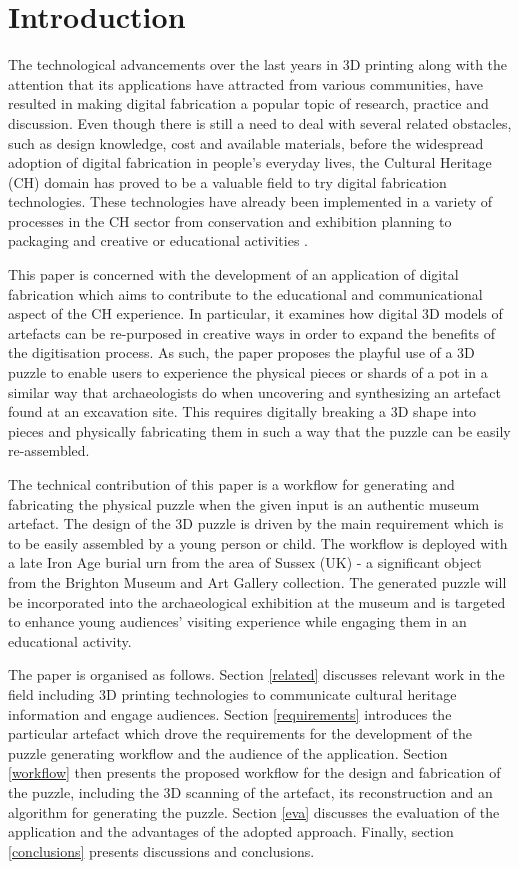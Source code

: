 \documentclass[acmlarge,screen]{acmart}
\begin{document}
\section{Introduction}
The technological advancements over the last years in 3D printing along with the attention that its applications have attracted from various communities, have resulted in making digital fabrication a popular topic of research, practice and discussion. Even though there is still a need to deal with several related obstacles, such as design knowledge, cost and  available materials, before the widespread adoption of digital fabrication in people's everyday lives, the Cultural Heritage (CH) domain has proved to be a valuable field to try digital fabrication technologies. These technologies have already been implemented in a variety of processes in the CH sector from conservation and exhibition planning to packaging and creative or educational activities \cite{Neely2013,Scopigno2014,Neumuller2014,Scopigno2015}.

This paper is concerned with the development of an application of digital fabrication which aims to contribute to the educational and communicational aspect of the CH experience. In particular, it examines how digital 3D models of artefacts can be re-purposed in creative ways in order to expand the benefits of the digitisation process. As such, the paper proposes the playful use of a 3D puzzle to enable users to experience the physical pieces or shards of a pot in a similar way that archaeologists do when uncovering and synthesizing an artefact found at an excavation site. This requires digitally breaking a 3D shape into pieces and physically fabricating them in such a way that the puzzle can be easily re-assembled.

The technical contribution of this paper is a workflow for generating and fabricating the physical puzzle when the given input is an authentic museum artefact. The design of the 3D puzzle is driven by the main requirement which is to be easily assembled by a young person or child. The workflow is deployed with a late Iron Age burial urn from the area of Sussex (UK) - a significant object from the Brighton Museum and Art Gallery collection. The generated puzzle will be incorporated into the archaeological exhibition at the museum and is targeted to enhance young audiences' visiting experience while engaging them in an educational activity.

The paper is organised as follows. Section \ref{related} discusses relevant work in the field including 3D printing technologies to communicate cultural heritage information and engage audiences. Section \ref{requirements} introduces the particular artefact which drove the requirements for the development of the puzzle generating workflow and the audience of the application. Section \ref{workflow} then presents the proposed workflow for the design and fabrication of the puzzle, including the 3D scanning of the artefact, its reconstruction and an algorithm for generating the puzzle. Section \ref{eva} discusses the evaluation of the application and the advantages of the adopted approach. Finally, section \ref{conclusions} presents discussions and conclusions.
\end{document}

